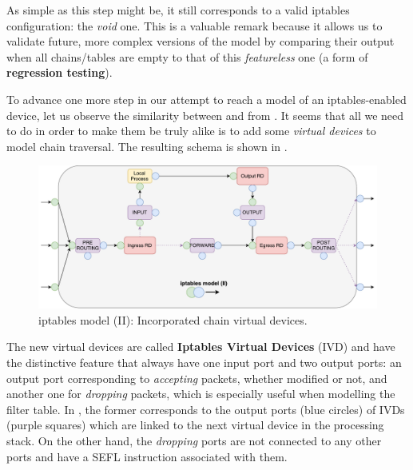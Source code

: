 As simple as this step might be, it still corresponds to a valid iptables
configuration: the \emph{void} one.  This is a valuable remark because it
allows us to validate future, more complex versions of the model by comparing
their output when all chains/tables are empty to that of this
\emph{featureless} one (a form of \textbf{regression testing}).

\bigskip

To advance one more step in our attempt to reach a model of an iptables-enabled
device, let us observe the similarity between
 and
 from
.  It seems that all we need to do
in order to make them be truly alike is to add some \emph{virtual devices} to
model chain traversal. The resulting schema is shown in
.

\begin{figure}[h]
  \centering
  \captionsetup{justification=centering}
  \includegraphics[scale=0.45]{src/img/iptables-2}
  \caption[iptables model (II): Incorporated chain virtual devices.]{iptables
  model (II): Incorporated chain virtual devices.}
  \label{fig:iptables-2}
\end{figure}

The new virtual devices are called \textbf{Iptables Virtual Devices}
(IVD) and have the distinctive feature
that always have one input port and two output ports: an output port
corresponding to \emph{accepting} packets, whether modified or not, and another
one for \emph{dropping} packets, which is especially useful when modelling the
filter table.  In , the former
corresponds to the output ports (blue circles) of IVDs (purple squares) which
are linked to the next virtual device in the processing stack.  On the other
hand, the \emph{dropping} ports are not connected to any other ports and have a
SEFL  instruction associated with them.

